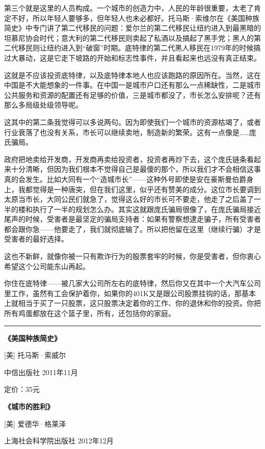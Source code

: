 第三个就是这里的人员构成。一个城市的创造力中，人民的年龄很重要，太老了肯定不好，所以年轻人要够多，但年轻人也未必都好。托马斯·索维尔在《美国种族简史》中专门讲了第二代移民的问题：爱尔兰的第二代移民让纽约进入到最黑暗的坦慕尼协会时代；意大利的第二代移民则卖起了私酒以及搞起了黑手党；黑人的第二代移民则让纽约进入到``破窗''时期。底特律的第二代黑人移民在1979年的时候搞过大暴动，这是它走下坡路的开始和标志性事件，并且看起来也远没有真正结束。

这就是不应该投资底特律，以及底特律本地人也应该跑路的原因所在。当然，这在中国是不大能想象的一件事。在中国一是城市户口还有那么一点稀缺性，二是城市公共服务和资源的配置还有足够的价值，三是城市都没了，市长怎么安排呢？还有那么多局级处级领导呢。

这其中的第二条我觉得可以多说两句。因为即使我们一个城市的资源枯竭了，或者行业衰落了也没有关系，市长可以继续卖地，制造新的繁荣。这有一点像是\ldots\ldots 庞氏骗局。

政府把地卖给开发商，开发商再卖给投资者，投资者再炒下去，这个庞氏链条看起来十分清晰，但因为我们根本不觉得自己是最傻的那个，所以我们才不会相信这事真的会发生。比如大同有一个``造城市长''------这种外号即使是安在豪斯曼伯爵身上，我都觉得是一种唐突，但在我们这里，似乎还有赞美的成分。这位市长要调到太原当市长，大同公民们就急了，觉得这么好的市长可不要走，他走了之后盖了一半的楼和执行了一半的规划怎么办。其实这就跟庞氏骗局很像了，在庞氏骗局接近尾声的时候，受害者是最坚定的骗局支持者：如果有警察想逮走骗子，所有受害者都会跟你急------他要走了，我们就彻底输了。所以把他留在这里（继续行骗）才是受害者的最好选择。

这也不新鲜，就像你被一只有欺诈行为的股票套牢的时候，你是受害者，但你衷心希望这个公司能东山再起。

你住在底特律------被几家大公司所左右的底特律，然后你又在其中一个大汽车公司里工作，虽然有工会保护着你，如果你的401K又是跟公司股票挂钩的话，那基本上就相当于买了一只股票，这只股票决定着你的工作、你的退休和你的投资。你把所有鸡蛋都放在这个篮子里，所有，还包括你的家庭。

\begin{center}\rule{0.5\linewidth}{0.5pt}\end{center}

\textbf{《美国种族简史》}

{[}美{]} 托马斯·索威尔

中信出版社 2011年11月

定价：35元

\textbf{《城市的胜利》}

{[}美{]} 爱德华·格莱泽

上海社会科学院出版社 2012年12月

